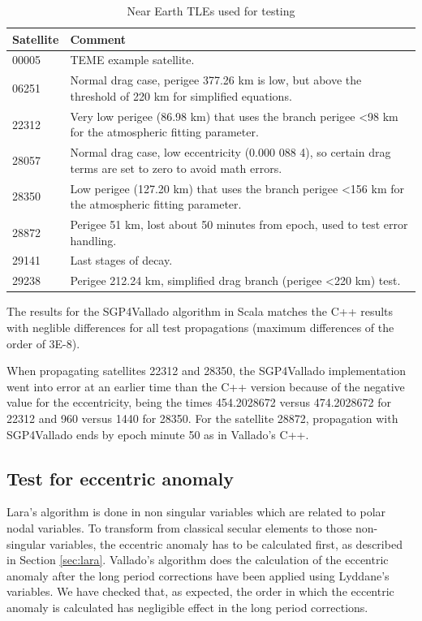 \documentclass{article}
\begin{document}
\begin{table}[!htbp]
\centering
\caption{Near Earth TLEs used for testing}\vspace{2mm}
\begin{tabular}{ll}
\hline
Satellite & Comment \\
\hline
00005 & TEME example satellite.\\
06251 & Normal drag case, perigee 377.26 km is low, but above the threshold of 220 km for simplified equations.\\
22312 & Very low perigee (86.98 km) that uses the branch perigee \textless 98 km for the atmospheric fitting parameter.\\
28057 & Normal drag case, low eccentricity (0.000 088 4), so certain drag terms are set to zero to avoid math errors.\\
28350 & Low perigee (127.20 km) that uses the branch perigee \textless 156 km for the atmospheric fitting parameter.\\
28872 & Perigee 51 km, lost about 50 minutes from epoch, used to test error handling.\\
29141 & Last stages of decay.\\
29238 & Perigee 212.24 km, simplified drag branch (perigee \textless 220 km) test.\\
\hline
\end{tabular}
\label{tab:res}
\end{table}

The results for the SGP4Vallado algorithm in Scala matches the C++ results with neglible differences for all test propagations (maximum differences of the order of 3E-8).

When propagating satellites 22312 and 28350, the SGP4Vallado implementation went into error at an earlier time
than the C++ version because of the negative value for the eccentricity, being the times 454.2028672 versus 474.2028672 for 22312 and 960 versus 1440 for 28350.
For the satellite 28872, propagation with SGP4Vallado ends by epoch minute 50 as in Vallado's C++.

\subsection{Test for eccentric anomaly}
\label{sec:trueanomaly}

Lara's algorithm is done in non singular variables which are related to polar nodal variables.
To transform from classical secular elements to those non-singular variables, the eccentric anomaly has to be calculated first, as described in Section \ref{sec:lara}.
Vallado's algorithm does the calculation of the eccentric anomaly after the long period corrections have been applied using Lyddane's variables.
We have checked that, as expected, the order in which the eccentric anomaly is calculated has negligible effect in the long period corrections.
\end{document}
